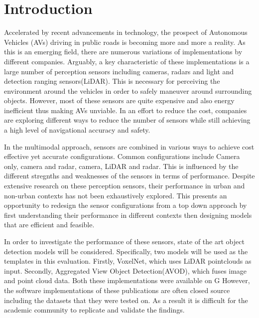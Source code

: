 %
%
\let\textcircled=\pgftextcircled
\chapter{Introduction}
\label{chap:intro}

Accelerated by recent advancements in technology, the prospect of Autonomous Vehicles (AVs) driving in public roads is becoming more and more a reality. As this is an emerging field, there are numerous variations of implementations by different companies. Arguably, a key characteristic of these implementations is a large number of perception sensors including cameras, radars and light and detection ranging sensors(LiDAR). This is necessary for perceiving the environment around the vehicles in order to safely maneuver around surrounding objects. However, most of these sensors are quite expensive and also energy inefficient thus making AVs unviable. In an effort to reduce the cost, companies are exploring different ways to reduce the number of sensors while still achieving a high level of navigational accuracy and safety.
 
In the multimodal approach, sensors are combined in various ways to achieve  cost effective yet accurate configurations. Common configurations include Camera only, camera and radar, camera, LiDAR and radar. This is influenced by the different stregnths and weaknesses of the sensors in terms of performance.  
Despite extensive research on these perception sensors, their performance  in urban and non-urban contexts has not been exhaustively explored. This presents an opportunity to redesign the sensor configurations from a top down approach by first understanding their performance in different contexts then designing models that are efficient and feasible.

In order to investigate the performance of these sensors, state of the art object detection models will be considered. Specifically, two models will be used as the templates in this evaluation. Firstly, VoxelNet, which uses LiDAR pointclouds as input. Secondly, Aggregated View Object Detection(AVOD), which fuses image and point cloud data. Both these implementations were available on G
 However, the software implementations of these publications are often closed source including the datasets that they were tested on. As a result it is difficult for the academic community to replicate and validate the findings. 




